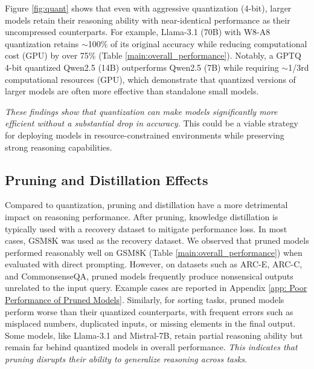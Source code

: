 Figure \ref{fig:quant} shows that even with aggressive quantization (4-bit), larger models retain their reasoning ability with near-identical performance as their uncompressed counterparts. For example, Llama-3.1 (70B) with W8-A8 quantization retains $\sim$100\% of its original accuracy while reducing computational cost (GPU) by over 75\% (Table \ref{main:overall_performance}). Notably, a GPTQ 4-bit quantized Qwen2.5 (14B) outperforms Qwen2.5 (7B) while requiring $\sim$1/3rd computational resources (GPU), which demonstrate that quantized versions of larger models are often more effective than standalone small models.

\textit{These findings show that quantization can make models significantly more efficient without a substantial drop in accuracy.} This could be a viable strategy for deploying models in resource-constrained environments while preserving strong reasoning capabilities.





\subsection{Pruning and Distillation Effects}
Compared to quantization, pruning and distillation have a more detrimental impact on reasoning performance. After pruning, knowledge distillation is typically used with a recovery dataset to mitigate performance loss. In most cases, GSM8K was used as the recovery dataset. We observed that pruned models performed reasonably well on GSM8K (Table \ref{main:overall_performance}) when evaluated with direct prompting. However, on datasets such as ARC-E, ARC-C, and CommonsenseQA, pruned models frequently produce nonsensical outputs unrelated to the input query. Example cases are reported in Appendix \ref{app: Poor Performance of Pruned Models}. Similarly, for sorting tasks, pruned models perform worse than their quantized counterparts, with frequent errors such as misplaced numbers, duplicated inputs, or missing elements in the final output. Some models, like Llama-3.1 and Mistral-7B, retain partial reasoning ability but remain far behind quantized models in overall performance. \emph{This indicates that pruning disrupts their ability to generalize reasoning across tasks.}


